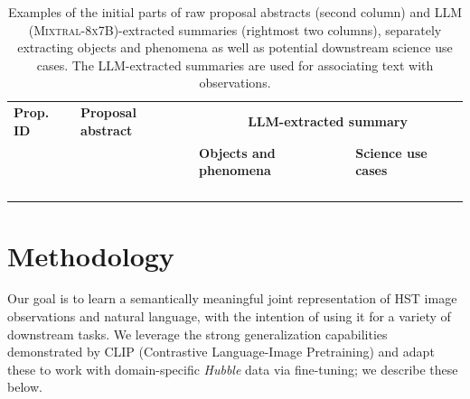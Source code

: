 \documentclass[10pt]{article} %
\newcommand{\hubble}{\emph{Hubble}\xspace}
\begin{document}
\begin{landscape}
      \begin{table}[h!]
          \centering
          \begin{tabular}{m{1.8cm} m{8cm} m{5cm} m{6cm}}
              \toprule
              \bfseries Prop. ID & \centering\arraybackslash \bfseries Proposal abstract & \multicolumn{2}{c}{\bfseries LLM-extracted summary} \tabularnewline
              \cmidrule(r){3-4}
              & & \centering\arraybackslash \bfseries Objects and phenomena & \centering\arraybackslash \bfseries Science use cases \tabularnewline
              \midrule
               & {\scriptsize } & {\scriptsize } & {\scriptsize } \tabularnewline
              \midrule
               & {\scriptsize } & {\scriptsize } & {\scriptsize } \tabularnewline
              \midrule
               & {\scriptsize } & {\scriptsize } & {\scriptsize } \tabularnewline
              \midrule
               & {\scriptsize } & {\scriptsize } & {\scriptsize } \tabularnewline
              \bottomrule
          \end{tabular}
          \caption{Examples of the initial parts of raw proposal abstracts (second column) and LLM (\textsc{Mixtral-8x7B})-extracted summaries (rightmost two columns), separately extracting objects and phenomena as well as potential downstream science use cases. The LLM-extracted summaries are used for associating text with observations.}
          \label{tab:datasetsumm}
      \end{table}
  \end{landscape}

\section{Methodology}
\label{sec:methodology}

Our goal is to learn a semantically  meaningful joint representation of HST image observations and natural language, with the intention of using it for a variety of downstream tasks. We leverage the strong generalization capabilities demonstrated by CLIP (Contrastive Language-Image Pretraining) and adapt these to work with domain-specific \hubble data via fine-tuning; we describe these below.
\end{document}
